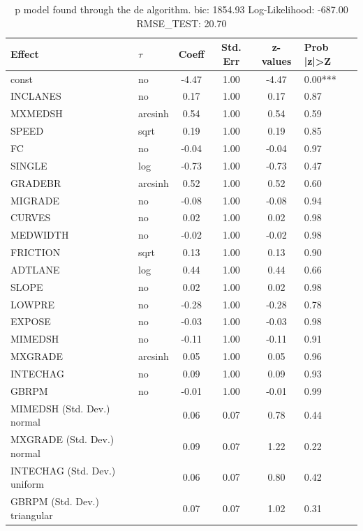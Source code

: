 \begin{table}
	\caption{p model found through the de algorithm. bic: 1854.93 Log-Likelihood: -687.00 RMSE_TEST: 20.70}
	\begin{center}
		\begin{tabular}{|l|l|c|c|c|l|}
			\hline
			Effect & $\tau$ & Coeff & Std. Err & z-values & Prob |z|>Z \\
			\hline
			const & no & -4.47 & 1.00 & -4.47 & 0.00*** \\
			\hline
			INCLANES & no & 0.17 & 1.00 & 0.17 & 0.87 \\
			\hline
			MXMEDSH & arcsinh & 0.54 & 1.00 & 0.54 & 0.59 \\
			\hline
			SPEED & sqrt & 0.19 & 1.00 & 0.19 & 0.85 \\
			\hline
			FC & no & -0.04 & 1.00 & -0.04 & 0.97 \\
			\hline
			SINGLE & log & -0.73 & 1.00 & -0.73 & 0.47 \\
			\hline
			GRADEBR & arcsinh & 0.52 & 1.00 & 0.52 & 0.60 \\
			\hline
			MIGRADE & no & -0.08 & 1.00 & -0.08 & 0.94 \\
			\hline
			CURVES & no & 0.02 & 1.00 & 0.02 & 0.98 \\
			\hline
			MEDWIDTH & no & -0.02 & 1.00 & -0.02 & 0.98 \\
			\hline
			FRICTION & sqrt & 0.13 & 1.00 & 0.13 & 0.90 \\
			\hline
			ADTLANE & log & 0.44 & 1.00 & 0.44 & 0.66 \\
			\hline
			SLOPE & no & 0.02 & 1.00 & 0.02 & 0.98 \\
			\hline
			LOWPRE & no & -0.28 & 1.00 & -0.28 & 0.78 \\
			\hline
			EXPOSE & no & -0.03 & 1.00 & -0.03 & 0.98 \\
			\hline
			MIMEDSH & no & -0.11 & 1.00 & -0.11 & 0.91 \\
			\hline
			MXGRADE & arcsinh & 0.05 & 1.00 & 0.05 & 0.96 \\
			\hline
			INTECHAG & no & 0.09 & 1.00 & 0.09 & 0.93 \\
			\hline
			GBRPM & no & -0.01 & 1.00 & -0.01 & 0.99 \\
			\hline
			MIMEDSH (Std. Dev.) normal &  & 0.06 & 0.07 & 0.78 & 0.44 \\
			\hline
			MXGRADE (Std. Dev.) normal &  & 0.09 & 0.07 & 1.22 & 0.22 \\
			\hline
			INTECHAG (Std. Dev.) uniform &  & 0.06 & 0.07 & 0.80 & 0.42 \\
			\hline
			GBRPM (Std. Dev.) triangular &  & 0.07 & 0.07 & 1.02 & 0.31 \\
			\hline
		\end{tabular}
	\end{center}
\end{table}